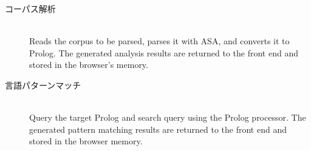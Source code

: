 \label{sec:2-1-2}
\begin{description}
\item[コーパス解析]\mbox{}\\
Reads the corpus to be parsed, parses it with ASA, and converts it to Prolog.
The generated analysis results are returned to the front end and stored in the browser's memory.
\item[言語パターンマッチ]\mbox{}\\
Query the target Prolog and search query using the Prolog processor.
The generated pattern matching results are returned to the front end and stored in the browser memory.
\end{description}

